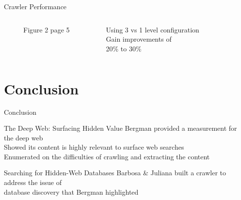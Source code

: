 \documentclass{beamer}
\begin{document}
\begin{frame}[fragile]{Crawler Performance}
\begin{columns}[T,onlytextwidth]
\begin{figure}
		\caption{Figure 2 page 5}
		\end{figure}
       \ \  Using 3 vs 1 level configuration \\ \ \ Gain improvements of \\ \ \ 20\% to 30\% \\
  \end{columns}
\end{frame}
\section{Conclusion}
\begin{frame}[fragile]{Conclusion}
\begin{block}{The Deep Web: Surfacing Hidden Value}
Bergman provided a measurement for the deep web \\
Showed its content is highly relevant to surface web searches \\
Enumerated on the difficulties of crawling and extracting the content
\end{block}
\begin{block}{Searching for Hidden-Web Databases}
Barbosa \& Juliana built a crawler to address the issue of  \\
database discovery that Bergman highlighted \\
\end{block}
\end{frame}
\end{document}
